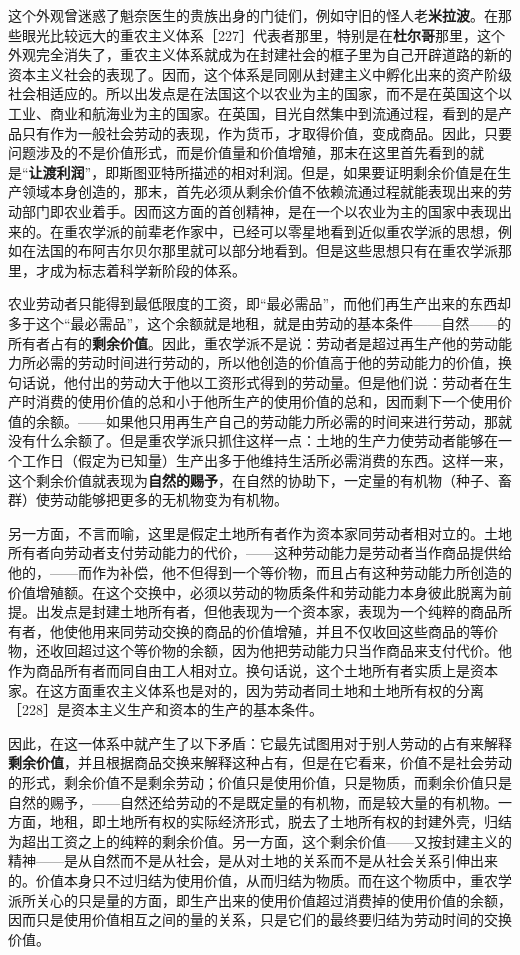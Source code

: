 这个外观曾迷惑了魁奈医生的贵族出身的门徒们，例如守旧的怪人老\textbf{米拉波}。在那些眼光比较远大的重农主义体系［227］代表者那里，特别是在\textbf{杜尔哥}那里，这个外观完全消失了，重农主义体系就成为在封建社会的框子里为自己开辟道路的新的资本主义社会的表现了。因而，这个体系是同刚从封建主义中孵化出来的资产阶级社会相适应的。所以出发点是在法国这个以农业为主的国家，而不是在英国这个以工业、商业和航海业为主的国家。在英国，目光自然集中到流通过程，看到的是产品只有作为一般社会劳动的表现，作为货币，才取得价值，变成商品。因此，只要问题涉及的不是价值形式，而是价值量和价值增殖，那末在这里首先看到的就是“\textbf{让渡利润}”，即斯图亚特所描述的相对利润。但是，如果要证明剩余价值是在生产领域本身创造的，那末，首先必须从剩余价值不依赖流通过程就能表现出来的劳动部门即农业着手。因而这方面的首创精神，是在一个以农业为主的国家中表现出来的。在重农学派的前辈老作家中，已经可以零星地看到近似重农学派的思想，例如在法国的布阿吉尔贝尔那里就可以部分地看到。但是这些思想只有在重农学派那里，才成为标志着科学新阶段的体系。

农业劳动者只能得到最低限度的工资，即“最必需品”，而他们再生产出来的东西却多于这个“最必需品”，这个余额就是地租，就是由劳动的基本条件——自然——的所有者占有的\textbf{剩余价值}。因此，重农学派不是说：劳动者是超过再生产他的劳动能力所必需的劳动时间进行劳动的，所以他创造的价值高于他的劳动能力的价值，换句话说，他付出的劳动大于他以工资形式得到的劳动量。但是他们说：劳动者在生产时消费的使用价值的总和小于他所生产的使用价值的总和，因而剩下一个使用价值的余额。——如果他只用再生产自己的劳动能力所必需的时间来进行劳动，那就没有什么余额了。但是重农学派只抓住这样一点：土地的生产力使劳动者能够在一个工作日（假定为已知量）生产出多于他维持生活所必需消费的东西。这样一来，这个剩余价值就表现为\textbf{自然的赐予}，在自然的协助下，一定量的有机物（种子、畜群）使劳动能够把更多的无机物变为有机物。

另一方面，不言而喻，这里是假定土地所有者作为资本家同劳动者相对立的。土地所有者向劳动者支付劳动能力的代价，——这种劳动能力是劳动者当作商品提供给他的，——而作为补偿，他不但得到一个等价物，而且占有这种劳动能力所创造的价值增殖额。在这个交换中，必须以劳动的物质条件和劳动能力本身彼此脱离为前提。出发点是封建土地所有者，但他表现为一个资本家，表现为一个纯粹的商品所有者，他使他用来同劳动交换的商品的价值增殖，并且不仅收回这些商品的等价物，还收回超过这个等价物的余额，因为他把劳动能力只当作商品来支付代价。他作为商品所有者而同自由工人相对立。换句话说，这个土地所有者实质上是资本家。在这方面重农主义体系也是对的，因为劳动者同土地和土地所有权的分离［228］是资本主义生产和资本的生产的基本条件。

因此，在这一体系中就产生了以下矛盾：它最先试图用对于别人劳动的占有来解释\textbf{剩余价值}，并且根据商品交换来解释这种占有，但是在它看来，价值不是社会劳动的形式，剩余价值不是剩余劳动；价值只是使用价值，只是物质，而剩余价值只是自然的赐予，——自然还给劳动的不是既定量的有机物，而是较大量的有机物。一方面，地租，即土地所有权的实际经济形式，脱去了土地所有权的封建外壳，归结为超出工资之上的纯粹的剩余价值。另一方面，这个剩余价值——又按封建主义的精神——是从自然而不是从社会，是从对土地的关系而不是从社会关系引伸出来的。价值本身只不过归结为使用价值，从而归结为物质。而在这个物质中，重农学派所关心的只是量的方面，即生产出来的使用价值超过消费掉的使用价值的余额，因而只是使用价值相互之间的量的关系，只是它们的最终要归结为劳动时间的交换价值。

